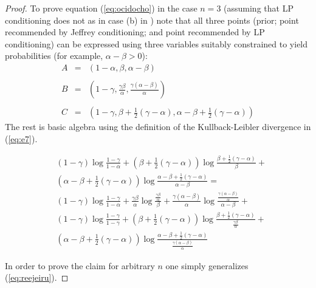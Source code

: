\documentclass[12pt]{article}
\begin{document}
\begin{proof}
  \label{prf:chaiphah}
  To prove equation (\ref{eq:ocidocho}) in the case $n=3$ (assuming
  that LP conditioning does not  as in case
  (b) in ) note that all three
  points (prior; point recommended by Jeffrey conditioning; and point
  recommended by LP conditioning) can be expressed using three
  variables suitably constrained to yield probabilities (for example,
  $\alpha-\beta>0$):
\begin{equation}
  \label{eq:reejeiru}
  \begin{array}{rcl}
    A&=&\left(1-\alpha,\beta,\alpha-\beta\right) \\
     && \\
    B&=&\left(1-\gamma,\frac{\gamma\beta}{\alpha},\frac{\gamma(\alpha-\beta)}{\alpha}\right) \\
     && \\
    C&=&\left(1-\gamma,\beta+\frac{1}{2}(\gamma-\alpha),\alpha-\beta+\frac{1}{2}(\gamma-\alpha)\right)
  \end{array}
\end{equation}
The rest is basic algebra using the definition of the Kullback-Leibler
divergence in (\ref{eq:e7}). 

\begin{equation}
  \label{eq:eirohzai}
  \begin{split}
  & (1-\gamma)\log\frac{1-\gamma}{1-\alpha}+\left(\beta+\frac{1}{2}(\gamma-\alpha)\right)\log\frac{\beta+\frac{1}{2}(\gamma-\alpha)}{\beta}+ \\
  & \left(\alpha-\beta+\frac{1}{2}(\gamma-\alpha)\right)\log\frac{\alpha-\beta+\frac{1}{2}(\gamma-\alpha)}{\alpha-\beta}= \\
  & (1-\gamma)\log\frac{1-\gamma}{1-\alpha}+\frac{\gamma\beta}{\alpha}\log\frac{\frac{\gamma\beta}{\alpha}}{\beta}+\frac{\gamma(\alpha-\beta)}{\alpha}\log\frac{\frac{\gamma(\alpha-\beta)}{\alpha}}{\alpha-\beta}+ \\
  & (1-\gamma)\log\frac{1-\gamma}{1-\gamma}+\left(\beta+\frac{1}{2}(\gamma-\alpha)\right)\log\frac{\beta+\frac{1}{2}(\gamma-\alpha)}{\frac{\gamma\beta}{\alpha}}+ \\
  & \left(\alpha-\beta+\frac{1}{2}(\gamma-\alpha)\right)\log\frac{\alpha-\beta+\frac{1}{2}(\gamma-\alpha)}{\frac{\gamma(\alpha-\beta)}{\alpha}}
  \end{split}
\end{equation}

In order to prove the claim for arbitrary $n$ one simply generalizes
(\ref{eq:reejeiru}).
\end{proof}
\end{document}
